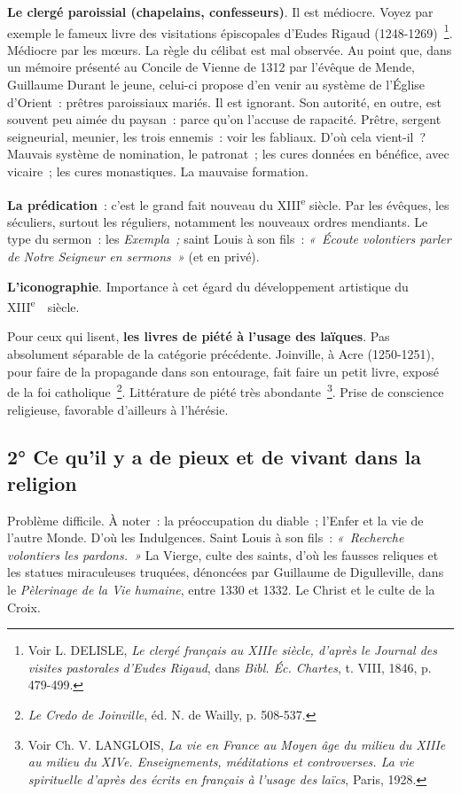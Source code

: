 \documentclass[french,twoside]{book} %
\begin{document}
\begin{listalpha}[itemsep=0pt,]
\item \textbf{Le clergé paroissial (chapelains, confesseurs)}. Il est médiocre. Voyez par exemple le fameux livre des visitations épiscopales d’Eudes Rigaud (1248-1269) \footnote{ Voir L. DELISLE, {\itshape Le clergé français au XIIIe siècle, d’après le Journal des visites pastorales d’Eudes Rigaud}, dans {\itshape Bibl. Éc. Chartes}, t. VIII, 1846, p. 479-499.}. Médiocre par les mœurs. La règle du célibat est mal observée. Au point que, dans un mémoire présenté au Concile de Vienne de 1312 par l’évêque de Mende, Guillaume Durant le jeune, celui-ci propose d’en venir au système de l’Église d’Orient : prêtres paroissiaux mariés. Il est ignorant. Son autorité, en outre, est souvent peu aimée du paysan : parce qu’on l’accuse de rapacité. Prêtre, sergent seigneurial, meunier, les trois ennemis : voir les fabliaux. D’où cela vient-il ? Mauvais système de nomination, le patronat ; les cures données en bénéfice, avec vicaire ; les cures monastiques. La mauvaise formation.
\item \textbf{La prédication} : c’est le grand fait nouveau du XIII\textsuperscript{e} siècle. Par les évêques, les séculiers, surtout les réguliers, notamment les nouveaux ordres mendiants. Le type du sermon : les {\itshape Exempla ;} saint Louis à son fils : \emph{« Écoute volontiers parler de Notre Seigneur en sermons »} (et en privé).
\item \textbf{L’iconographie}. Importance à cet égard du développement artistique du XIII\textsuperscript{e}  siècle.
\item Pour ceux qui lisent, \textbf{les livres de piété à l’usage des laïques}. Pas absolument séparable de la catégorie précédente. Joinville, à Acre (1250-1251), pour faire de la propagande dans son entourage, fait faire un petit livre, exposé de la foi catholique \footnote{{\itshape Le Credo de Joinville}, éd. N. de Wailly, p. 508-537.}. Littérature de piété très abondante \footnote{ Voir Ch. V. LANGLOIS, {\itshape La vie en France au Moyen âge du milieu du XIIIe au milieu du XIVe. Enseignements, méditations et controverses. La vie spirituelle d’après des écrits en français à l’usage des laïcs}, Paris, 1928.}. Prise de conscience religieuse, favorable d’ailleurs à l’hérésie.
\end{listalpha}

\subsection[{2° Ce qu’il y a de pieux et de vivant dans la religion}]{2° Ce qu’il y a de pieux et de vivant dans la religion}
\noindent Problème difficile. À noter : la préoccupation du diable ; l’Enfer et la vie de l’autre Monde. D’où les Indulgences. Saint Louis à son fils : \emph{« Recherche volontiers les pardons. »} La Vierge, culte des saints, d’où les fausses reliques et les statues miraculeuses truquées, dénoncées par Guillaume de Digulleville, dans le {\itshape Pèlerinage de la Vie humaine}, entre 1330 et 1332. Le Christ et le culte de la Croix.
\end{document}

